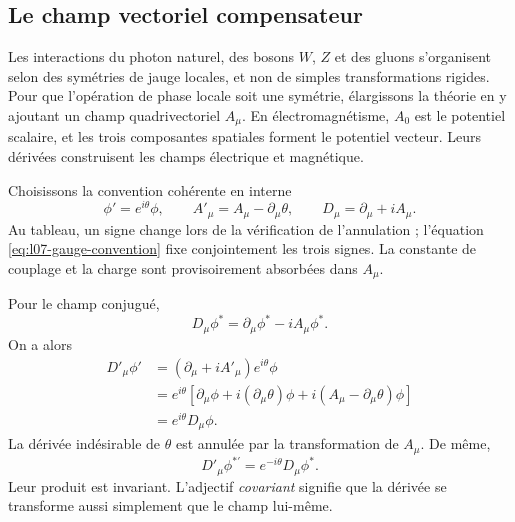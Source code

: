 \subsection{Le champ vectoriel compensateur}

Les interactions du photon naturel, des bosons \(W\), \(Z\) et des gluons s’organisent selon des symétries de jauge locales, et non de simples transformations rigides. Pour que l’opération de phase locale soit une symétrie, élargissons la théorie en y ajoutant un champ quadrivectoriel \(A_\mu\). En électromagnétisme, \(A_0\) est le potentiel scalaire, et les trois composantes spatiales forment le potentiel vecteur. Leurs dérivées construisent les champs électrique et magnétique.

Choisissons la convention cohérente en interne
\begin{equation}
  \phi'=e^{i\theta}\phi,
  \qquad
  A'_\mu=A_\mu-\partial_\mu\theta,
  \qquad
  D_\mu=\partial_\mu+iA_\mu.
  \label{eq:l07-gauge-convention}
\end{equation}
Au tableau, un signe change lors de la vérification de l’annulation ; l’équation \eqref{eq:l07-gauge-convention} fixe conjointement les trois signes. La constante de couplage et la charge sont provisoirement absorbées dans \(A_\mu\).

Pour le champ conjugué,
\begin{equation}
  D_\mu\phi^*=\partial_\mu\phi^*-iA_\mu\phi^*.
\end{equation}
On a alors
\begin{align}
  D'_\mu\phi'
  &=
  \left(\partial_\mu+iA'_\mu\right)e^{i\theta}\phi
  \nonumber\\
  &=
  e^{i\theta}
  \left[
    \partial_\mu\phi+i(\partial_\mu\theta)\phi
    +i(A_\mu-\partial_\mu\theta)\phi
  \right]
  \nonumber\\
  &=e^{i\theta}D_\mu\phi.
  \label{eq:l07-covariant-transform}
\end{align}
La dérivée indésirable de \(\theta\) est annulée par la transformation de \(A_\mu\). De même,
\begin{equation}
  D'_\mu\phi^{*\prime}=e^{-i\theta}D_\mu\phi^*.
\end{equation}
Leur produit est invariant. L’adjectif \emph{covariant} signifie que la dérivée se transforme aussi simplement que le champ lui-même.

